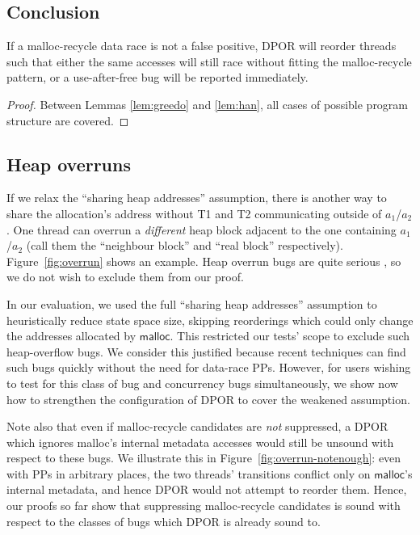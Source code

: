 \subsection{Conclusion}

\setcounter{theorem}{2}
\begin{theorem}
	\label{thm:recycle}
	If a malloc-recycle data race is not a false positive, DPOR will reorder threads such that either the same accesses will still race without fitting the malloc-recycle pattern, or a use-after-free bug will be reported immediately.
\end{theorem}
\begin{proof}
	Between Lemmas \ref{lem:greedo} and \ref{lem:han}, all cases of possible program structure are covered.
\end{proof}


\subsection{Heap overruns}
\label{sec:owned}

If we relax the ``sharing heap addresses'' assumption, there is another way to share the allocation's address without T1 and T2 communicating outside of $a_1$/$a_2$.
One thread can overrun a {\em different} heap block adjacent to the one containing $a_1$/$a_2$ (call them the ``neighbour block'' and ``real block'' respectively).
Figure~\ref{fig:overrun} shows an example.
Heap overrun bugs are quite serious \cite{eternal-war}, so we do not wish to exclude them from our proof.

In our evaluation, we used the full ``sharing heap addresses'' assumption to heuristically reduce state space size,
skipping reorderings which could only change the addresses allocated by $\mathsf{malloc}$.
This restricted our tests' scope to exclude such heap-overflow bugs.
We consider this justified because recent techniques \cite{sparc-ssm} can find such bugs quickly without the need for data-race PPs.
However, for users wishing to test for this class of bug and concurrency bugs simultaneously,
we show now how to strengthen the configuration of DPOR to cover the weakened assumption.

Note also that even if malloc-recycle candidates are {\em not} suppressed,
a DPOR which ignores malloc's internal metadata accesses would still be unsound with respect to these bugs.
We illustrate this in Figure~\ref{fig:overrun-notenough}:
even with PPs in arbitrary places, the two threads' transitions conflict only on $\mathsf{malloc}$'s internal metadata,
and hence DPOR would not attempt to reorder them.
Hence, our proofs so far show that suppressing malloc-recycle candidates is sound with respect to the classes of bugs which DPOR is already sound to.

